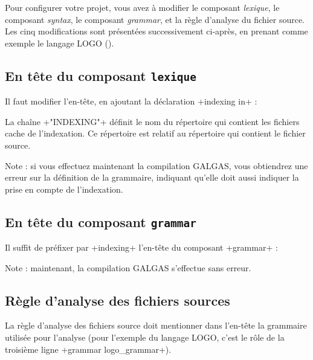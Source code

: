 Pour configurer votre projet, vous avez à modifier le composant \emph{lexique}, le composant \emph{syntax}, le composant \emph{grammar}, et la règle d'analyse du fichier source. Les cinq modifications sont présentées successivement ci-après, en prenant comme exemple le langage LOGO ().





\subsection{En tête du composant \texttt{lexique}}

Il faut modifier l'en-tête, en ajoutant la déclaration  \ggs+indexing in+ :


\begin{galgas}
lexique logo_lexique indexing in "INDEXING" {
  ...
\end{galgas}

La chaîne \ggs+"INDEXING"+ définit le nom du répertoire qui contient les fichiers cache de l'indexation. Ce répertoire est relatif au répertoire qui contient le fichier source.

Note : si vous effectuez maintenant la compilation GALGAS, vous obtiendrez une erreur sur la définition de la grammaire, indiquant qu'elle doit aussi indiquer la prise en compte de l'indexation.




\subsection{En tête du composant \texttt{grammar}}

Il suffit de préfixer par \ggs+indexing+ l'en-tête du composant \ggs+grammar+ :

\begin{galgas}
indexing grammar logo_grammar ... {
  ...
\end{galgas}

Note : maintenant, la compilation GALGAS s'effectue sans erreur.




\subsection{Règle d'analyse des fichiers sources}

La règle d'analyse des fichiers source doit mentionner dans l'en-tête la grammaire utilisée pour l'analyse (pour l'exemple du langage LOGO, c'est le rôle de la troisième ligne \ggs+grammar logo_grammar+).

